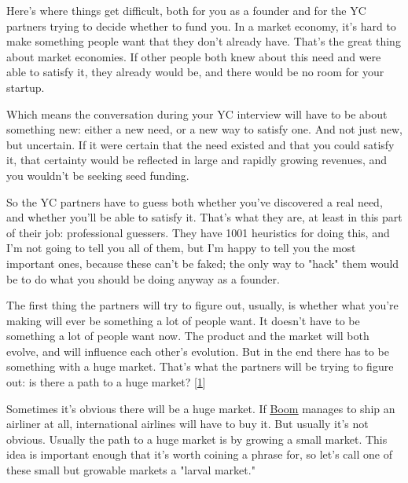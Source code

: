 Here's
                  where things get difficult, both for you as a founder and for
                  the YC partners trying to decide whether to fund you. In a
                  market economy, it's hard to make something people want that
                  they don't already have. That's the great thing about market
                  economies. If other people both knew about this need and were
                  able to satisfy it, they already would be, and there would be
                  no room for your startup.

Which means the
                  conversation during your YC interview will have to be about
                  something new: either a new need, or a new way to satisfy one.
                  And not just new, but uncertain. If it were certain that the
                  need existed and that you could satisfy it, that certainty
                  would be reflected in large and rapidly growing revenues, and
                  you wouldn't be seeking seed funding.

So the YC
                  partners have to guess both whether you've discovered a real
                  need, and whether you'll be able to satisfy it. That's what
                  they are, at least in this part of their job: professional
                  guessers. They have 1001 heuristics for doing this, and I'm
                  not going to tell you all of them, but I'm happy to tell you
                  the most important ones, because these can't be faked; the
                  only way to "hack" them would be to do what you should be
                  doing anyway as a founder.

The first thing the
                  partners will try to figure out, usually, is whether what
                  you're making will ever be something a lot of people want. It
                  doesn't have to be something a lot of people want now. The
                  product and the market will both evolve, and will influence
                  each other's evolution. But in the end there has to be
                  something with a huge market. That's what the partners will be
                  trying to figure out: is there a path to a huge market?
                  [\href{\#f1n}{1}]

Sometimes it's obvious there will be a huge
                  market. If
                  \href{https://boomsupersonic.com/}{\underline{Boom}} manages
                  to ship an airliner at all, international airlines will have
                  to buy it. But usually it's not obvious. Usually the path to a
                  huge market is by growing a small market. This idea is
                  important enough that it's worth coining a phrase for, so
                  let's call one of these small but growable markets a "larval
                  market."

